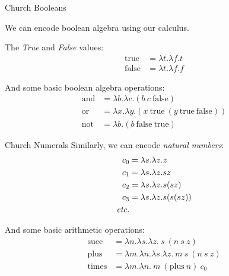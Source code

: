 \documentclass[10pt]{beamer}
\begin{document}
\begin{frame}[fragile]{Church Booleans}
       
    We can encode boolean algebra using our calculus.
    
    The \emph{True} and \emph{False} values:
\begin{align*}
\mathrm{true} &= \lambda t.\lambda f. t \\
\mathrm{false} &= \lambda t.\lambda f. f
\end{align*}

    And some basic boolean algebra operations:   
\begin{align*}
\mathrm{and} &= \lambda b. \lambda c. (b\ c\ \mathrm{false}) \\
\mathrm{or}  &= \lambda x. \lambda y. (x\ \mathrm{true}\ (y\ \mathrm{true}\ \mathrm{false})) \\
\mathrm{not} &= \lambda b. (b\ \mathrm{false}\ \mathrm{true})
\end{align*}

\end{frame}

\begin{frame}{Church Numerals}
    Similarly, we can encode \textit{natural numbers}:
\begin{align*}
c_0 &= \lambda s.\lambda z. z \\
c_1 &= \lambda s.\lambda z. s z \\
c_2 &= \lambda s.\lambda z. s (s z) \\ 
c_3 &= \lambda s.\lambda z. s (s (s z)) \\
\text{\textit{etc.}}
\end{align*}

    And some basic arithmetic operations:   
\begin{align*}
\mathrm{succ} &= \lambda n. \lambda s. \lambda z.\ s\ (n\ s\ z)\\
\mathrm{plus} &= \lambda m. \lambda n. \lambda s. \lambda z.\ m\ s\ (n\ s\ z)\\
\mathrm{times} &= \lambda m. \lambda n.\ m\ (\mathrm{plus}\ n)\ c_0
\end{align*}

\end{frame}
\end{document}
